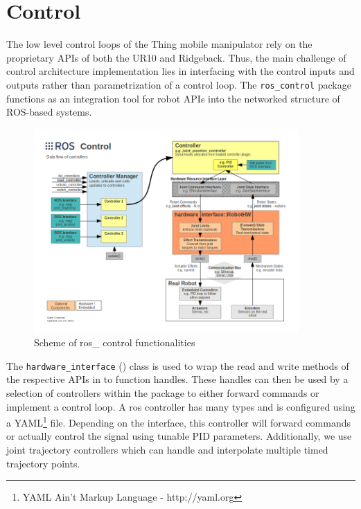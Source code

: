 \documentclass[times, utf8, diplomski, english]{fer}
\begin{document}
\section{Control}\label{section:control}
The low level control loops of the Thing mobile manipulator rely on the proprietary APIs of both the UR10 and Ridgeback.
Thus, the main challenge of control architecture implementation lies in interfacing with the control inputs and outputs rather than parametrization of a control loop.
The \verb|ros_control| package functions as an integration tool for robot APIs into the networked structure of ROS-based systems.
\begin{figure}
\centering
\includegraphics[width=0.9\textwidth]{ros_control}
\caption{Scheme of ros\_ control functionalities}
\label{fig:ros control}
\end{figure}
The \verb|hardware_interface| () class is used to wrap the read and write methods of the respective APIs in to function handles. 
These handles can then be used by a selection of controllers within the package to either forward commands or implement a control loop.
A ros controller has many types and is configured using a YAML\footnote{YAML Ain't Markup Language - http://yaml.org} file. 
Depending on the interface, this controller will forward commands or actually control the signal using tunable PID parameters.
Additionally, we use joint trajectory controllers which can handle and interpolate multiple timed trajectory points.
\end{document}
